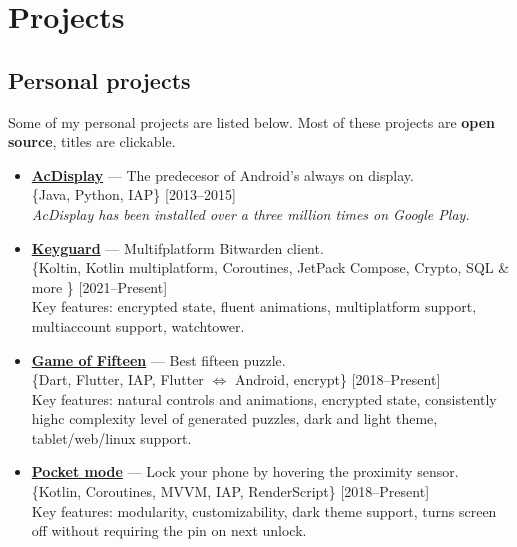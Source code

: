 \documentclass[a4paper]{article}
\begin{document}
	\section*{Projects}
	\subsection*{Personal projects}
	Some of my personal projects are listed below. Most of these projects are \textbf{open source}, titles are clickable.
	\begin{itemize}
		\item \faAndroid \enskip \href{http://artemchep.com/acdisplay/}{\textbf{AcDisplay}} --- The predecesor of Android's always on display. \\[0.2em]
		{\footnotesize \{Java, Python, IAP\} \hfill [2013--2015]} \\[0.2em]
		\textit{AcDisplay has been installed over a three million times on Google Play.} 

		\item \faAndroid \enskip \faLinux \enskip \href{https://github.com/AChep/keyguard-app}{\textbf{Keyguard}} --- Multifplatform Bitwarden client. \\[0.2em]
		{\footnotesize \{Koltin, Kotlin multiplatform, Coroutines, JetPack Compose, Crypto, SQL \& more \} \hfill [2021--Present]} \\[0.2em]
		Key features: encrypted state, fluent animations, multiplatform support, multiaccount support, watchtower. 

		\item \faAndroid \enskip \faChrome \enskip \faLinux \enskip \href{https://github.com/AChep/15puzzle}{\textbf{Game of Fifteen}} --- Best fifteen puzzle. \\[0.2em]
		{\footnotesize \{Dart, Flutter, IAP, Flutter $\Leftrightarrow$ Android, encrypt\} \hfill [2018--Present]} \\[0.2em]
		Key features: natural controls and animations, encrypted state, consistently highc complexity level of generated puzzles, dark and light theme, tablet/web/linux support. 
		
		\item \faAndroid \enskip \href{https://github.com/AChep/PocketMode}{\textbf{Pocket mode}} --- Lock your phone by hovering the proximity sensor. \\[0.2em]
		{\footnotesize \{Kotlin, Coroutines, MVVM, IAP, RenderScript\} \hfill [2018--Present]} \\[0.2em]
		Key features: modularity, customizability, dark theme support, turns screen off without requiring the pin on next unlock.   
		

\end{itemize}
\end{document}
